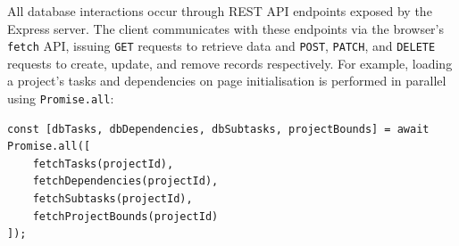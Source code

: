 \documentclass[12pt,nonacm,acmlarge,titlepage,screen]{acmart}
\begin{document}
All database interactions occur through REST API endpoints exposed by the Express server.
The client communicates with these endpoints via the browser's \texttt{fetch} API, issuing
\texttt{GET} requests to retrieve data and \texttt{POST}, \texttt{PATCH}, and \texttt{DELETE}
requests to create, update, and remove records respectively. For example, loading a project's
tasks and dependencies on page initialisation is performed in parallel using
\texttt{Promise.all}:

\begin{lstlisting}[style=jsstyle, caption={Parallel data fetch on page load (interactive-chart.js)}]
    const [dbTasks, dbDependencies, dbSubtasks, projectBounds] = await Promise.all([
    fetchTasks(projectId),
    fetchDependencies(projectId),
    fetchSubtasks(projectId),
    fetchProjectBounds(projectId)
]);
\end{lstlisting}



\end{document}
